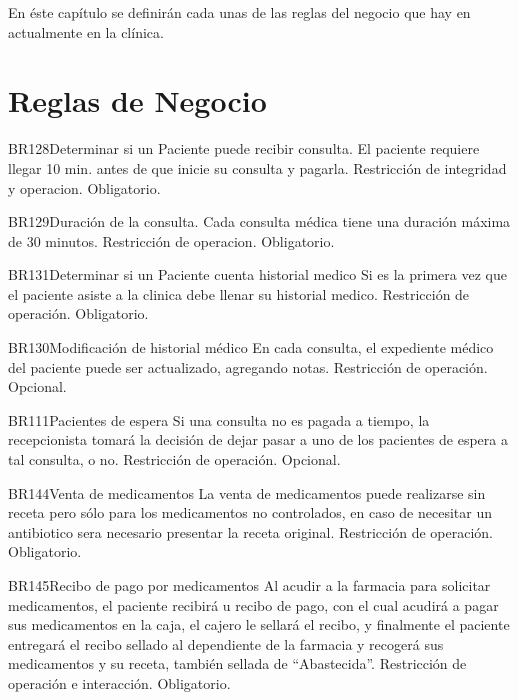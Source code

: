 En \'este cap\'itulo se definir\'an cada unas de las reglas del negocio que hay en actualmente en la cl\'inica.
\section{Reglas de Negocio}

\begin{BussinesRule}{BR128}{Determinar si un Paciente puede recibir consulta.} 
	\BRitem[Descripción:] El paciente requiere llegar 10 min. antes de que inicie su consulta y pagarla.
	\BRitem[Tipo:] Restricción de integridad y operacion.
	\BRitem[Nivel:] Obligatorio.
\end{BussinesRule}
\begin{BussinesRule}{BR129}{Duraci\'on de la consulta.} 
	\BRitem[Descripción:] Cada consulta m\'edica tiene una duraci\'on m\'axima de 30 minutos.
	\BRitem[Tipo:] Restricción de operacion.
	\BRitem[Nivel:] Obligatorio.
\end{BussinesRule}

\begin{BussinesRule}{BR131}{Determinar si un Paciente cuenta historial medico}
	\BRitem[Descripción:] Si es la primera vez que el paciente asiste a la clinica debe llenar su historial medico.
	\BRitem[Tipo:] Restricción de operación.
	\BRitem[Nivel:] Obligatorio.
\end{BussinesRule}
\begin{BussinesRule}{BR130}{Modificaci\'on de historial m\'edico}
	\BRitem[Descripción:] En cada consulta, el expediente m\'edico del paciente puede ser actualizado, agregando notas.
	\BRitem[Tipo:] Restricción de operación.
	\BRitem[Nivel:] Opcional.
\end{BussinesRule}
\begin{BussinesRule}{BR111}{Pacientes de espera}
	\BRitem[Descripción:] Si una consulta no es pagada a tiempo, la recepcionista tomar\'a la decisi\'on de dejar pasar a uno de los pacientes de espera a tal consulta, o no.
	\BRitem[Tipo:] Restricción de operación.
	\BRitem[Nivel:] Opcional.
\end{BussinesRule}

\begin{BussinesRule}{BR144}{Venta de medicamentos}
	\BRitem[Descripción:] La venta de medicamentos puede realizarse sin receta pero s\'olo para los medicamentos no controlados, en caso de necesitar un antibiotico sera necesario presentar la receta original.
	\BRitem[Tipo:] Restricción de operación.
	\BRitem[Nivel:] Obligatorio.
\end{BussinesRule}
\begin{BussinesRule}{BR145}{Recibo de pago por medicamentos}
	\BRitem[Descripción:] Al acudir a la farmacia para solicitar medicamentos, el paciente recibir\'a u recibo de pago, con el cual acudir\'a a pagar sus medicamentos en la caja, el cajero le sellar\'a el recibo, y finalmente el paciente entregar\'a el recibo sellado al dependiente de la farmacia y recoger\'a sus medicamentos y su receta, tambi\'en sellada de "`Abastecida"'.
	\BRitem[Tipo:] Restricción de operación e interacci\'on.
	\BRitem[Nivel:] Obligatorio.
\end{BussinesRule}

